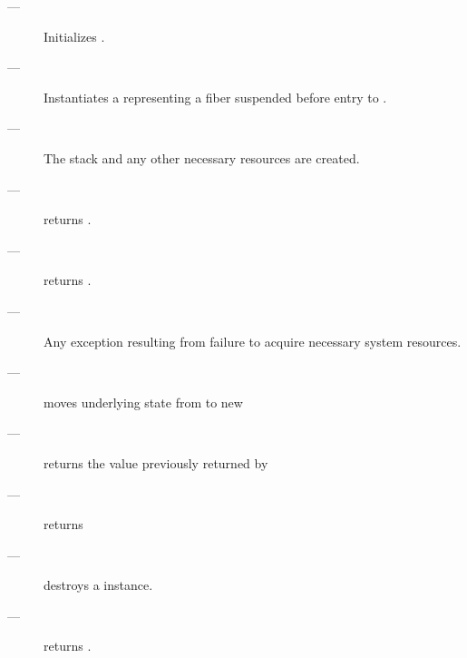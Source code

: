 \effects
\begin{description}
    \item[---] Initializes .
    \item[---] Instantiates a \fiber representing a fiber suspended before
              entry to .
    \item[---] The stack and any other necessary resources are created.
\end{description}

\postcond
\begin{description}
    \item[---]  returns .
    \item[---]  returns .
\end{description}

\except
\begin{description}
    \item[---] Any exception resulting from failure to acquire necessary
               system resources.
\end{description}


\effects
\begin{description}
    \item[---] moves underlying state from  to new \fiber
\end{description}

\postcond
\begin{description}
    \item[---]  returns the value previously returned by 
    \item[---]  returns 
\end{description}


\effects
\begin{description}
    \item[---] destroys a \fiber instance.
\end{description}

\requires
\begin{description}
    \item[---]  returns .
\end{description}

